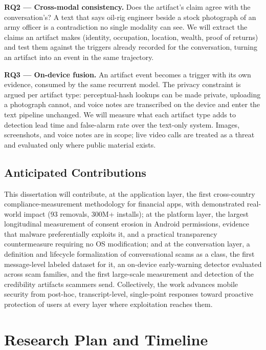\documentclass[letterpaper,11pt]{article}
\begin{document}
\textbf{RQ2 --- Cross-modal consistency.} Does the artifact's claim
agree with the conversation's? A text that says oil-rig engineer beside
a stock photograph of an army officer is a contradiction no single
modality can see. We will extract the claims an artifact makes
(identity, occupation, location, wealth, proof of returns) and test
them against the triggers already recorded for the conversation,
turning an artifact into an event in the same trajectory.

\textbf{RQ3 --- On-device fusion.} An artifact event becomes a trigger
with its own evidence, consumed by the same recurrent model. The
privacy constraint is argued per artifact type: perceptual-hash lookups
can be made private, uploading a photograph cannot, and voice notes are
transcribed on the device and enter the text pipeline unchanged. We
will measure what each artifact type adds to detection lead time and
false-alarm rate over the text-only system. Images, screenshots, and
voice notes are in scope; live video calls are treated as a threat and
evaluated only where public material exists.

\subsection{Anticipated Contributions}
\label{sec:contrib}

This dissertation will contribute, at the application layer, the first
cross-country compliance-measurement methodology for financial apps,
with demonstrated real-world impact (93 removals, 300M+ installs); at
the platform layer, the largest longitudinal measurement of consent
erosion in Android permissions, evidence that malware preferentially
exploits it, and a practical transparency countermeasure requiring no
OS modification; and at the conversation layer, a definition and lifecycle
formalization of conversational scams as a class, the first
message-level labeled dataset for it, an on-device early-warning
detector evaluated across scam families, and the first large-scale
measurement and detection of the credibility artifacts scammers send. Collectively, the work
advances mobile security from post-hoc, transcript-level, single-point
responses toward proactive protection of users at every layer where
exploitation reaches them.

\section{Research Plan and Timeline}
\label{sec:timeline}
\end{document}
